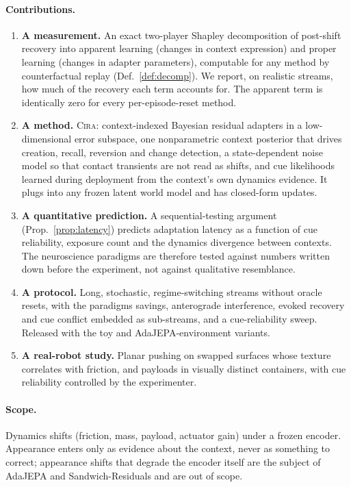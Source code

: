 \documentclass[10pt]{article}
\newcommand{\method}{\textsc{Cira}}
\begin{document}
\paragraph{Contributions.}
\begin{enumerate}[label=\textbf{C\arabic*.},leftmargin=2.2em]
  \item \textbf{A measurement.} An exact two-player Shapley decomposition of post-shift recovery into
  apparent learning (changes in context expression) and proper learning (changes in adapter
  parameters), computable for any method by counterfactual replay (Def.~\ref{def:decomp}). We report,
  on realistic streams, how much of the recovery each term accounts for. The apparent term is
  identically zero for every per-episode-reset method.
  \item \textbf{A method.} \method{}: context-indexed Bayesian residual adapters in a low-dimensional
  error subspace, one nonparametric context posterior that drives creation, recall, reversion and
  change detection, a state-dependent noise model so that contact transients are not read as shifts,
  and cue likelihoods learned during deployment from the context's own dynamics evidence. It plugs into
  any frozen latent world model and has closed-form updates.
  \item \textbf{A quantitative prediction.} A sequential-testing argument (Prop.~\ref{prop:latency})
  predicts adaptation latency as a function of cue reliability, exposure count and the dynamics
  divergence between contexts. The neuroscience paradigms are therefore tested against numbers
  written down before the experiment, not against qualitative resemblance.
  \item \textbf{A protocol.} Long, stochastic, regime-switching streams without oracle resets, with the
  paradigms savings, anterograde interference, evoked recovery and cue conflict embedded as
  sub-streams, and a cue-reliability sweep. Released with the toy and AdaJEPA-environment variants.
  \item \textbf{A real-robot study.} Planar pushing on swapped surfaces whose texture correlates with
  friction, and payloads in visually distinct containers, with cue reliability controlled by the
  experimenter.
\end{enumerate}

\paragraph{Scope.}
Dynamics shifts (friction, mass, payload, actuator gain) under a frozen encoder. Appearance enters only
as evidence about the context, never as something to correct; appearance shifts that degrade the
encoder itself are the subject of AdaJEPA and Sandwich-Residuals and are out of scope.
\end{document}
